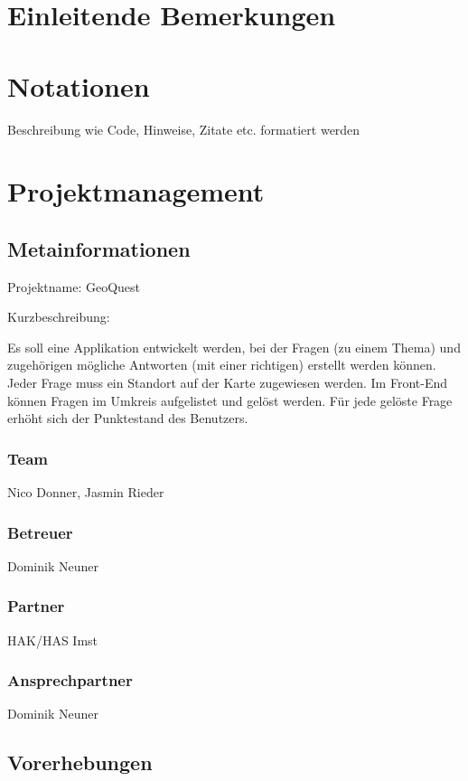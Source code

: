 \def \currentAuthor {Gabi Sorglos} %

\chapter*{Einleitende Bemerkungen}

\chapter*{Notationen}
Beschreibung wie Code, Hinweise, Zitate etc. formatiert werden  

\chapter{Projektmanagement}

\section{Metainformationen}


Projektname: GeoQuest

Kurzbeschreibung: 

Es soll eine Applikation entwickelt werden, bei der Fragen (zu einem Thema) und zugehörigen mögliche Antworten (mit einer richtigen) erstellt werden können. Jeder Frage muss ein Standort auf der Karte zugewiesen werden. 
Im Front-End können Fragen im Umkreis aufgelistet und gelöst werden. Für jede gelöste Frage erhöht sich der Punktestand des Benutzers.  

\subsection{Team}
Nico Donner, Jasmin Rieder
\subsection{Betreuer}
Dominik Neuner
\subsection{Partner}
HAK/HAS Imst
\subsection{Ansprechpartner}
Dominik Neuner
\section{Vorerhebungen}

